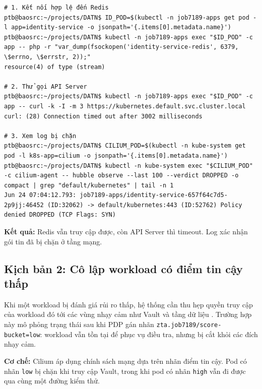 \begin{listing}[H]
\begin{verbatim}
# 1. Kết nối hợp lệ đến Redis
ptb@baosrc:~/projects/DATN$ ID_POD=$(kubectl -n job7189-apps get pod -l app=identity-service -o jsonpath='{.items[0].metadata.name}')
ptb@baosrc:~/projects/DATN$ kubectl -n job7189-apps exec "$ID_POD" -c app -- php -r "var_dump(fsockopen('identity-service-redis', 6379, \$errno, \$errstr, 2));"
resource(4) of type (stream)

# 2. Thử gọi API Server
ptb@baosrc:~/projects/DATN$ kubectl -n job7189-apps exec "$ID_POD" -c app -- curl -k -I -m 3 https://kubernetes.default.svc.cluster.local
curl: (28) Connection timed out after 3002 milliseconds

# 3. Xem log bị chặn
ptb@baosrc:~/projects/DATN$ CILIUM_POD=$(kubectl -n kube-system get pod -l k8s-app=cilium -o jsonpath='{.items[0].metadata.name}')
ptb@baosrc:~/projects/DATN$ kubectl -n kube-system exec "$CILIUM_POD" -c cilium-agent -- hubble observe --last 100 --verdict DROPPED -o compact | grep "default/kubernetes" | tail -n 1
Jun 24 07:04:12.793: job7189-apps/identity-service-657f64c7d5-2p9jj:46452 (ID:32062) -> default/kubernetes:443 (ID:52762) Policy denied DROPPED (TCP Flags: SYN)
\end{verbatim}
\caption{Bằng chứng chặn truy cập API Server}
\label{lst:c3_kb1}
\end{listing}

\textbf{Kết quả:} Redis vẫn truy cập được, còn API Server thì timeout. Log xác nhận gói tin đã bị chặn ở tầng mạng.

\subsection{Kịch bản 2: Cô lập workload có điểm tin cậy thấp}
\label{subsec:c3_kb2}

Khi một workload bị đánh giá rủi ro thấp, hệ thống cần thu hẹp quyền truy cập của workload đó tới các vùng nhạy cảm như Vault và tầng dữ liệu \parencite{mitre_t1046,mitre_t1048}. Trường hợp này mô phỏng trạng thái sau khi PDP gán nhãn \texttt{zta.job7189/score-bucket=low}: workload vẫn tồn tại để phục vụ điều tra, nhưng bị cắt khỏi các đích nhạy cảm.

\textbf{Cơ chế:} Cilium áp dụng chính sách mạng dựa trên nhãn điểm tin cậy. Pod có nhãn \texttt{low} bị chặn khi truy cập Vault, trong khi pod có nhãn \texttt{high} vẫn đi được qua cùng một đường kiểm thử.

